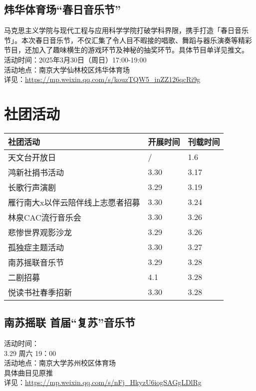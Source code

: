 \documentclass[letterpaper, 12pt]{article}
\begin{document}
\begin{multicols}{2}
\begin{tabular}{|>{\centering\arraybackslash}m{}|m{}|m{}|}
    \hline
\end{tabular}
\subsection{炜华体育场“春日音乐节”}
马克思主义学院与现代工程与应用科学学院打破学科界限，携手打造「春日音乐节」。本次春日音乐节，不仅汇集了令人目不暇接的唱歌、舞蹈与器乐演奏等精彩节目，还加入了趣味横生的游戏环节及神秘的抽奖环节。具体节目单详见推文。
\\活动时间：2025年3月30日（周日）17:00-19:00
\\活动地点：南京大学仙林校区炜华体育场
\\详见：\url{https://mp.weixin.qq.com/s/kouzTQW5_inZZ126qcRi9g}

\section{社团活动}
\begin{tabular}{|>{\centering\arraybackslash}m{}|m{}|m{}|}
    \hline
    社团活动 & 开展时间 & 刊载时间\\
    \hline\hline
    天文台开放日 & / & 1.6\\
    鸿新社捐书活动 & 3.30 & 3.17\\
    长歌行声演剧 & 3.29 & 3.19\\
    雁行南大x以伴云陪伴线上志愿者招募 & 3.30 & 3.24\\
    林泉CAC流行音乐会 & 3.30 & 3.26\\
    悲惨世界观影沙龙 & 3.29 & 3.26\\
    孤独症主题活动 & 3.30 & 3.27\\
    南苏摇联音乐节 & 3.29 & 3.28\\
    二剧招募 & 4.1 & 3.28\\
    悦读书社春季招新 & 3.30 & 3.28\\
    \hline
\end{tabular}
\subsection{南苏摇联 首届“复苏”音乐节}
活动时间：
\\3.29 周六 19：00
\\活动地点：南京大学苏州校区体育场
\\具体曲目见原推
\\详见：\url{https://mp.weixin.qq.com/s/nFj_HkyzU6iogSAGgLDlRg}


\end{multicols}
\end{document}
